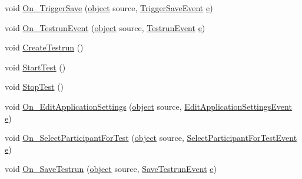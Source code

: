 \begin{DoxyCompactItemize}
\item 
void \hyperlink{class_web_analyzer_1_1_controller_1_1_main_controller_aadab56b24729cdfeeac6474825289c83}{On\+\_\+\+Trigger\+Save} (\hyperlink{_u_i_2_h_t_m_l_resources_2js_2lib_2underscore_8min_8js_aae18b7515bb2bc4137586506e7c0c903}{object} source, \hyperlink{class_web_analyzer_1_1_events_1_1_trigger_save_event}{Trigger\+Save\+Event} \hyperlink{_u_i_2_h_t_m_l_resources_2js_2lib_2bootstrap_8min_8js_ab5902775854a8b8440bcd25e0fe1c120}{e})
\item 
void \hyperlink{class_web_analyzer_1_1_controller_1_1_main_controller_a29b97f1032832f1a4600d6e00b038067}{On\+\_\+\+Testrun\+Event} (\hyperlink{_u_i_2_h_t_m_l_resources_2js_2lib_2underscore_8min_8js_aae18b7515bb2bc4137586506e7c0c903}{object} source, \hyperlink{class_web_analyzer_1_1_events_1_1_testrun_event}{Testrun\+Event} \hyperlink{_u_i_2_h_t_m_l_resources_2js_2lib_2bootstrap_8min_8js_ab5902775854a8b8440bcd25e0fe1c120}{e})
\item 
void \hyperlink{class_web_analyzer_1_1_controller_1_1_main_controller_a89558728bf22eec76ec4ff3ca0660490}{Create\+Testrun} ()
\item 
void \hyperlink{class_web_analyzer_1_1_controller_1_1_main_controller_a15dde2aa8b4f85e01fdfecf48483bbf8}{Start\+Test} ()
\item 
void \hyperlink{class_web_analyzer_1_1_controller_1_1_main_controller_ac75ad84f0191902e27a711efd325c648}{Stop\+Test} ()
\item 
void \hyperlink{class_web_analyzer_1_1_controller_1_1_main_controller_a0a28f10eb1aa2b814224a31a8a801054}{On\+\_\+\+Edit\+Application\+Settings} (\hyperlink{_u_i_2_h_t_m_l_resources_2js_2lib_2underscore_8min_8js_aae18b7515bb2bc4137586506e7c0c903}{object} source, \hyperlink{class_web_analyzer_1_1_events_1_1_edit_application_settings_event}{Edit\+Application\+Settings\+Event} \hyperlink{_u_i_2_h_t_m_l_resources_2js_2lib_2bootstrap_8min_8js_ab5902775854a8b8440bcd25e0fe1c120}{e})
\item 
void \hyperlink{class_web_analyzer_1_1_controller_1_1_main_controller_ae8eae4c1e6dda888f7231e39aaabba3c}{On\+\_\+\+Select\+Participant\+For\+Test} (\hyperlink{_u_i_2_h_t_m_l_resources_2js_2lib_2underscore_8min_8js_aae18b7515bb2bc4137586506e7c0c903}{object} source, \hyperlink{class_web_analyzer_1_1_events_1_1_select_participant_for_test_event}{Select\+Participant\+For\+Test\+Event} \hyperlink{_u_i_2_h_t_m_l_resources_2js_2lib_2bootstrap_8min_8js_ab5902775854a8b8440bcd25e0fe1c120}{e})
\item 
void \hyperlink{class_web_analyzer_1_1_controller_1_1_main_controller_aa00702c9b2f489d0db4a676f08e176aa}{On\+\_\+\+Save\+Testrun} (\hyperlink{_u_i_2_h_t_m_l_resources_2js_2lib_2underscore_8min_8js_aae18b7515bb2bc4137586506e7c0c903}{object} source, \hyperlink{class_web_analyzer_1_1_events_1_1_save_testrun_event}{Save\+Testrun\+Event} \hyperlink{_u_i_2_h_t_m_l_resources_2js_2lib_2bootstrap_8min_8js_ab5902775854a8b8440bcd25e0fe1c120}{e})
\end{DoxyCompactItemize}
